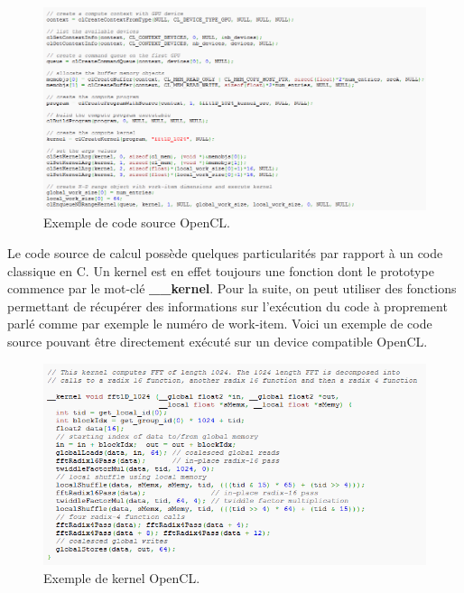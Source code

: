 \documentclass[a4paper,11pt]{report}
\begin{document}
{\begin{figure}[h]
   \begin{center}
   \includegraphics[scale = 0.60]{kernelOpencl.png}
   \end{center}
  \caption{Exemple de code source OpenCL.}
\end{figure}

\normalsize{
Le code source de calcul possède quelques particularités par rapport à un code classique en C. Un kernel est en effet toujours une fonction dont le prototype commence par le mot-clé {\bf \_\_kernel}. Pour la suite, on peut utiliser des fonctions permettant de récupérer des informations sur l'exécution du code à proprement parlé comme par exemple le numéro de work-item. Voici un exemple de code source pouvant être directement exécuté sur un device compatible OpenCL. 
}

\clearpage

\begin{figure}[h]
   \begin{center}
   \includegraphics[scale = 0.78]{kernelOpenclCode.png}
   \end{center}
  \caption{Exemple de kernel OpenCL.}
\end{figure}

}
\end{document}
